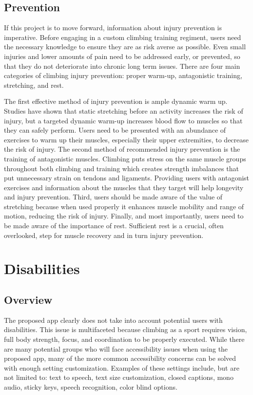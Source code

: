 \documentclass[10pt,twocolumn]{article}
\begin{document}
\subsection{Prevention}

If this project is to move forward, information about injury prevention is imperative. Before engaging in a custom climbing training regiment, users need the necessary knowledge to ensure they are as risk averse as possible. Even small injuries and lower amounts of pain need to be addressed early, or prevented, so that they do not deteriorate into chronic long term issues. There are four main categories of climbing injury prevention: proper warm-up, antagonistic training, stretching, and rest. 

 The first effective method of injury prevention is ample dynamic warm up. Studies have shown that static stretching before an activity increases the risk of injury, but a targeted dynamic warm-up increases blood flow to muscles so that they can safely perform. \cite{noauthor_top_nodate} Users need to be presented with an abundance of exercises to warm up their muscles, especially their upper extremities, to decrease the risk of injury. The second method of recommended injury prevention is the training of antagonistic muscles. Climbing puts stress on the same muscle groups throughout both climbing and training which creates strength imbalances that put unnecessary strain on tendons and ligaments. Providing users with antagonist exercises and information about the muscles that they target will help longevity and injury prevention. \cite{meyers_rock_nodate} Third, users should be made aware of the value of stretching because when used properly it enhances muscle mobility and range of motion, reducing the risk of injury. \cite{noauthor_top_nodate} Finally, and most importantly, users need to be made aware of the importance of rest. Sufficient rest is a crucial, often overlooked, step for muscle recovery and in turn injury prevention. 

    
\section{Disabilities}

\subsection{Overview}

The proposed app clearly does not take into account potential users with disabilities. This issue is multifaceted because climbing as a sport requires vision, full body strength, focus, and coordination to be properly executed. While there are many potential groups who will face accessibility issues when using the proposed app, many of the more common accessibility concerns can be solved with enough setting customization. Examples of these settings include, but are not limited to: text to speech, text size customization, closed captions, mono audio, sticky keys, speech recognition, color blind options. \cite{noauthor_computer_nodate}
\end{document}
